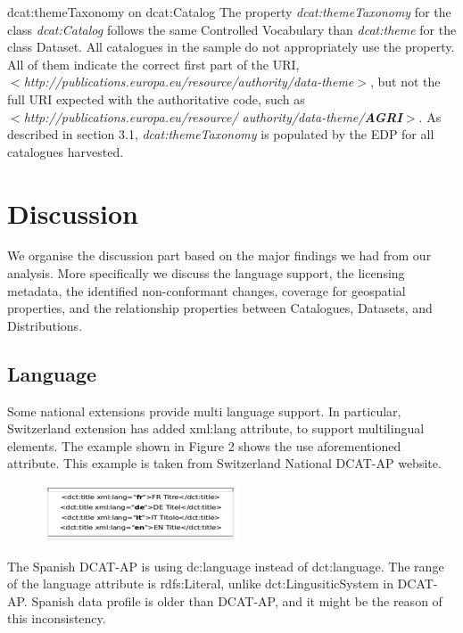 \documentclass[<options>]{elsarticle}
\begin{document}
dcat:themeTaxonomy on dcat:Catalog
The property \textit{dcat:themeTaxonomy} for the class \textit{dcat:Catalog} follows the same Controlled Vocabulary than \textit{dcat:theme} for the class Dataset. All catalogues in the sample do not appropriately use the property. All of them indicate the correct first part of the URI, \\
\textit{$<$http://publications.europa.eu/resource/authority/data-theme$>$}, but not the full URI expected with the authoritative code, such as \\ \textit{$<$http://publications.europa.eu/resource/ authority/data-theme/\textbf{AGRI}$>$}. As described in section 3.1, \textit{dcat:themeTaxonomy} is populated by the EDP for all catalogues harvested.

\section{Discussion}
We organise the discussion part based on the major findings we had from our analysis. More specifically we discuss the language support, the licensing metadata, the identified non-conformant changes, coverage for geospatial properties, and the relationship properties between Catalogues, Datasets, and Distributions.

\subsection{Language}
Some national extensions provide multi language support. In particular, Switzerland extension has added xml:lang attribute, to support multilingual elements. The example shown in Figure 2 shows the use aforementioned attribute. This example is taken from Switzerland National DCAT-AP website.

\begin{figure}[!h]
\includegraphics{replace26.png}
\end{figure}

The Spanish DCAT-AP is using dc:language instead of  dct:language. The range of the language attribute is rdfs:Literal, unlike dct:LingusiticSystem in DCAT-AP. Spanish data profile is older than DCAT-AP, and it might be the reason of this inconsistency.  
\end{document}
